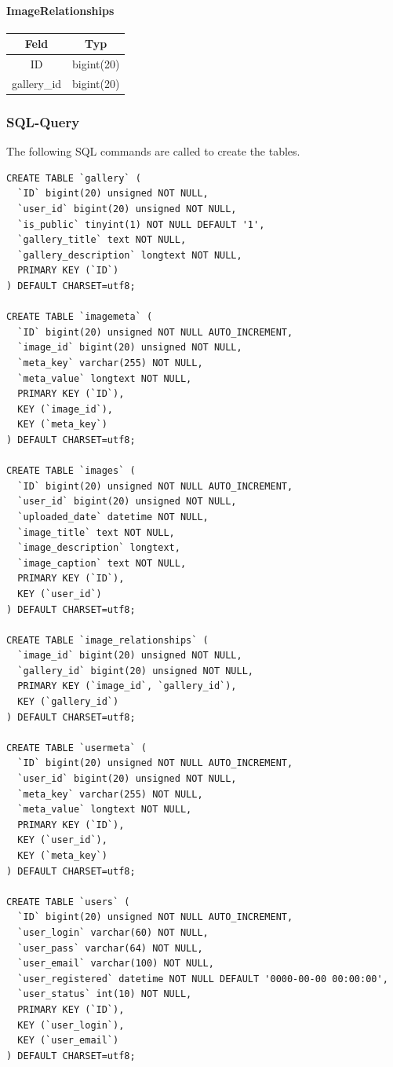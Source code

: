 \documentclass[a4paper,12pt,oneside]{article} %
\begin{document}
\paragraph*{ImageRelationships}

\begin{tabular}{|c|c|}
\hline 
Feld & Typ\tabularnewline
\hline 
\hline 
ID & bigint(20)\tabularnewline
\hline 
gallery\_id & bigint(20)\tabularnewline
\end{tabular}

\subsubsection{SQL-Query}

The following SQL commands are called to create the tables.

\begin{lstlisting}
CREATE TABLE `gallery` (
  `ID` bigint(20) unsigned NOT NULL,
  `user_id` bigint(20) unsigned NOT NULL,
  `is_public` tinyint(1) NOT NULL DEFAULT '1',
  `gallery_title` text NOT NULL,
  `gallery_description` longtext NOT NULL,
  PRIMARY KEY (`ID`)
) DEFAULT CHARSET=utf8;

CREATE TABLE `imagemeta` (
  `ID` bigint(20) unsigned NOT NULL AUTO_INCREMENT,
  `image_id` bigint(20) unsigned NOT NULL,
  `meta_key` varchar(255) NOT NULL,
  `meta_value` longtext NOT NULL,
  PRIMARY KEY (`ID`),
  KEY (`image_id`),
  KEY (`meta_key`)
) DEFAULT CHARSET=utf8;

CREATE TABLE `images` (
  `ID` bigint(20) unsigned NOT NULL AUTO_INCREMENT,
  `user_id` bigint(20) unsigned NOT NULL,
  `uploaded_date` datetime NOT NULL,
  `image_title` text NOT NULL,
  `image_description` longtext,
  `image_caption` text NOT NULL,
  PRIMARY KEY (`ID`),
  KEY (`user_id`)
) DEFAULT CHARSET=utf8;

CREATE TABLE `image_relationships` (
  `image_id` bigint(20) unsigned NOT NULL,
  `gallery_id` bigint(20) unsigned NOT NULL,
  PRIMARY KEY (`image_id`, `gallery_id`),
  KEY (`gallery_id`)
) DEFAULT CHARSET=utf8;

CREATE TABLE `usermeta` (
  `ID` bigint(20) unsigned NOT NULL AUTO_INCREMENT,
  `user_id` bigint(20) unsigned NOT NULL,
  `meta_key` varchar(255) NOT NULL,
  `meta_value` longtext NOT NULL,
  PRIMARY KEY (`ID`),
  KEY (`user_id`),
  KEY (`meta_key`)
) DEFAULT CHARSET=utf8;

CREATE TABLE `users` (
  `ID` bigint(20) unsigned NOT NULL AUTO_INCREMENT,
  `user_login` varchar(60) NOT NULL,
  `user_pass` varchar(64) NOT NULL,
  `user_email` varchar(100) NOT NULL,
  `user_registered` datetime NOT NULL DEFAULT '0000-00-00 00:00:00',
  `user_status` int(10) NOT NULL,
  PRIMARY KEY (`ID`),
  KEY (`user_login`),
  KEY (`user_email`)
) DEFAULT CHARSET=utf8;
\end{lstlisting}
\end{document}
